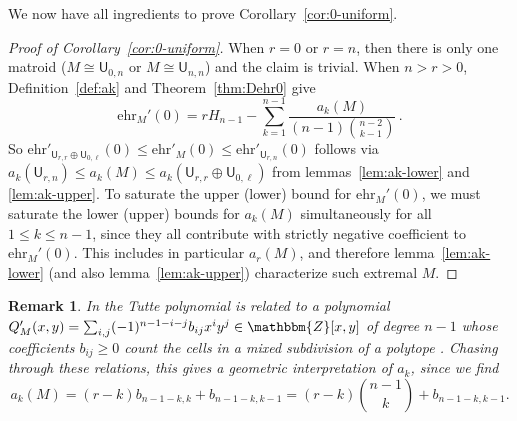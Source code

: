 \documentclass[pagesize,paper=A4,11pt,bibliography=totoc,oneside]{scrartcl}
\newtheorem{remark}[thm]{Remark}
\newcommand{\ZZ}{\mathbbm{Z}}
\newcommand{\UM}[2]{\mathsf{U}_{#2,#1}} %
\newcommand{\ehr}{\mathrm{ehr}}
\newcommand{\HN}{H} %
\begin{document}
We now have all ingredients to prove Corollary~\ref{cor:0-uniform}.
\begin{proof}[{Proof of Corollary~\ref{cor:0-uniform}}]
    When $r=0$ or $r=n$, then there is only one matroid ($M\cong\UM{n}{0}$ or $M\cong\UM{n}{n}$) and the claim is trivial. When $n>r>0$, Definition~\ref{def:ak} and Theorem~\ref{thm:Dehr0} give
    \begin{equation}\label{eq:ehr0-ak}
        \ehr_M'(0)=r \HN_{n-1} - \sum_{k=1}^{n-1} \frac{a_k(M)}{(n-1)\binom{n-2}{k-1}}\,.
    \end{equation}
    So $\ehr'_{\UM{r}{r}\oplus\UM{\ell}{0}}(0)\leq\ehr'_M(0)\leq\ehr'_{\UM{n}{r}}(0)$ follows via $a_k(\UM{n}{r})\leq a_k(M)\leq a_k(\UM{r}{r}\oplus\UM{\ell}{0})$ from lemmas~\ref{lem:ak-lower} and \ref{lem:ak-upper}. To saturate the upper (lower) bound for $\ehr_M'(0)$, we must saturate the lower (upper) bounds for $a_k(M)$ simultaneously for all $1\leq k\leq n-1$, since they all contribute with strictly negative coefficient to $\ehr_M'(0)$. This includes in particular $a_r(M)$, and therefore lemma~\ref{lem:ak-lower} (and also lemma~\ref{lem:ak-upper}) characterize such extremal $M$.
\end{proof}
\begin{remark}\label{rem:CameronFink}
    In \cite[Theorem~3.2]{CameronFink:TutteLattice} the Tutte polynomial is related to a polynomial $Q'_M(x,y)=\sum_{i,j} (-1)^{n-1-i-j} b_{ij}x^i y^j\in\ZZ[x,y]$ of degree $n-1$ whose coefficients $b_{ij}\geq 0$ count the cells in a mixed subdivision of a polytope
    \cite[Theorm~1.4]{CameronFink:TutteLattice}. Chasing through these relations, this gives a geometric interpretation of $a_k$, since we find
    \begin{equation*}
        a_k(M)= (r-k) b_{n-1-k,k}+b_{n-1-k,k-1}
        =(r-k) \binom{n-1}{k}+b_{n-1-k,k-1}.
    \end{equation*}
\end{remark}
\end{document}
